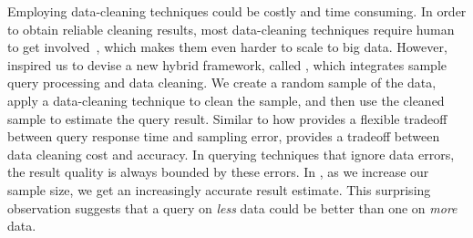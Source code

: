 



\iffalse
Employing data-cleaning techniques could be costly and time consuming.
In order to obtain reliable cleaning results, most data-cleaning techniques require human to get involved~\cite{DBLP:conf/sigmod/JefferyFH08,DBLP:journals/pvldb/FanLMTY10,DBLP:journals/pvldb/YakoutENOI11,DBLP:journals/pvldb/WangKFF12}, which makes them even harder to scale to big data. 
However, \saqp inspired us to devise a new hybrid \saqp framework, called \saqpplus, which integrates sample query processing and data cleaning.
We create a random sample of the data, apply a data-cleaning technique to clean the sample, and then use the cleaned sample to estimate the query result.
Similar to how \saqp provides a flexible tradeoff between query response time and sampling error, \saqpplus provides a tradeoff between data cleaning cost and accuracy.
In querying techniques that ignore data errors, the result quality is always bounded by these errors.
In \saqpplus, as we increase our sample size, we get an increasingly accurate result estimate.
This surprising observation suggests that a query on \emph{less} data could be better than one on \emph{more} data.

